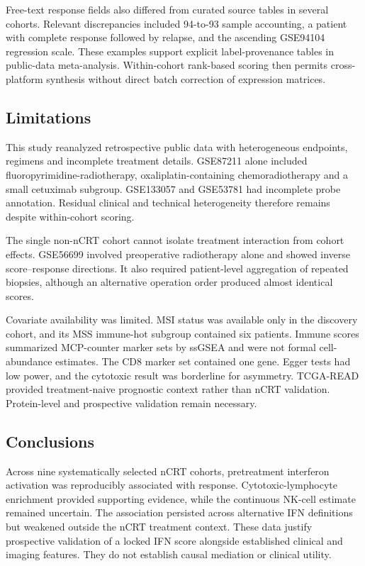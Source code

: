 \documentclass[11pt,a4paper]{article}
\begin{document}
Free-text response fields also differed from curated source tables in several cohorts. Relevant discrepancies included 94-to-93 sample accounting, a patient with complete response followed by relapse, and the ascending GSE94104 regression scale. These examples support explicit label-provenance tables in public-data meta-analysis. Within-cohort rank-based scoring then permits cross-platform synthesis without direct batch correction of expression matrices.

\subsection{Limitations}

This study reanalyzed retrospective public data with heterogeneous endpoints, regimens and incomplete treatment details. GSE87211 alone included fluoropyrimidine-radiotherapy, oxaliplatin-containing chemoradiotherapy and a small cetuximab subgroup. GSE133057 and GSE53781 had incomplete probe annotation. Residual clinical and technical heterogeneity therefore remains despite within-cohort scoring.

The single non-nCRT cohort cannot isolate treatment interaction from cohort effects. GSE56699 involved preoperative radiotherapy alone and showed inverse score--response directions. It also required patient-level aggregation of repeated biopsies, although an alternative operation order produced almost identical scores.

Covariate availability was limited. MSI status was available only in the discovery cohort, and its MSS immune-hot subgroup contained six patients. Immune scores summarized MCP-counter marker sets by ssGSEA and were not formal cell-abundance estimates. The CD8 marker set contained one gene. Egger tests had low power, and the cytotoxic result was borderline for asymmetry. TCGA-READ provided treatment-naive prognostic context rather than nCRT validation. Protein-level and prospective validation remain necessary.

\subsection{Conclusions}

Across nine systematically selected nCRT cohorts, pretreatment interferon activation was reproducibly associated with response. Cytotoxic-lymphocyte enrichment provided supporting evidence, while the continuous NK-cell estimate remained uncertain. The association persisted across alternative IFN definitions but weakened outside the nCRT treatment context. These data justify prospective validation of a locked IFN score alongside established clinical and imaging features. They do not establish causal mediation or clinical utility.
\end{document}

